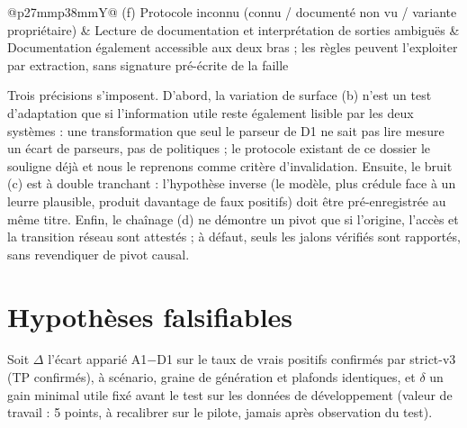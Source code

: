 \documentclass[11pt,a4paper]{article}
\begin{document}
\begin{table}[H]
\begin{tabularx}{\textwidth}{@{}p{27mm}p{38mm}Y@{}}
(f) Protocole inconnu (connu / document\'e non vu / variante propri\'etaire) & Lecture de documentation et interpr\'etation de sorties ambigu\"es & Documentation \'egalement accessible aux deux bras ; les r\`egles peuvent l'exploiter par extraction, sans signature pr\'e-\'ecrite de la faille \\
\bottomrule
\end{tabularx}
\caption{Conditions candidates d'\'ecart A1$-$D1. Hypoth\`eses de m\'ecanisme \`a tester ; aucune n'est un r\'esultat. Le contre-domaine o\`u D1 est attendu gagnant (faille \`a signature connue, contr\^ole r\'ep\'etable \`a grande \'echelle, preuve d\'eterministe exig\'ee) fait partie du plan comme strate de contr\^ole.}
\label{tab:conditions}
\end{table}

Trois pr\'ecisions s'imposent. D'abord, la variation de surface (b) n'est un test d'adaptation que si l'information utile reste \'egalement lisible par les deux syst\`emes : une transformation que seul le parseur de D1 ne sait pas lire mesure un \'ecart de parseurs, pas de politiques ; le protocole existant de ce dossier le souligne d\'ej\`a et nous le reprenons comme crit\`ere d'invalidation. Ensuite, le bruit (c) est \`a double tranchant : l'hypoth\`ese inverse (le mod\`ele, plus cr\'edule face \`a un leurre plausible, produit davantage de faux positifs) doit \^etre pr\'e-enregistr\'ee au m\^eme titre. Enfin, le cha\^inage (d) ne d\'emontre un pivot que si l'origine, l'acc\`es et la transition r\'eseau sont attest\'es ; \`a d\'efaut, seuls les jalons v\'erifi\'es sont rapport\'es, sans revendiquer de pivot causal.

\section{Hypoth\`eses falsifiables}
\label{sec:hypotheses}

Soit $\Delta$ l'\'ecart appari\'e A1$-$D1 sur le taux de vrais positifs confirm\'es par strict-v3 (TP confirm\'es), \`a sc\'enario, graine de g\'en\'eration et plafonds identiques, et $\delta$ un gain minimal utile fix\'e avant le test sur les donn\'ees de d\'eveloppement (valeur de travail : 5 points, \`a recalibrer sur le pilote, jamais apr\`es observation du test).
\end{document}
